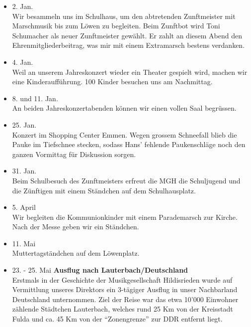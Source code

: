 \begin{history}


    \begin{itemize}

        \item[]2. Jan.\\
        Wir besammeln uns im Schulhaus, um den abtretenden Zunftmeister mit
        Marschmusik bis zum Löwen zu begleiten. Beim Zunftbot wird Toni
        Schumacher als neuer Zunftmeister gewählt. Er zahlt an diesem Abend den
        Ehrenmitgliederbeitrag, was mir mit einem Extramarsch bestens verdanken.

        \item[]4. Jan.\\
        Weil an unserem Jahreskonzert wieder ein Theater gespielt wird, machen
        wir eine Kinderaufführung. 100 Kinder besuchen uns am Nachmittag.

        \item[]8. und 11. Jan.\\
        An beiden Jahreskonzertabenden können wir einen vollen Saal begrüssen.

        \item[]25. Jan.\\
        Konzert im Shopping Center Emmen. Wegen grossem Schneefall blieb die
        Pauke im Tiefschnee stecken, sodass Hans' fehlende Paukenschläge noch
        den ganzen Vormittag für Diskussion sorgen.

        \item[]31. Jan.\\
        Beim Schulbesuch des Zunftmeisters erfreut die MGH die Schuljugend und
        die Zünftigen mit einem Ständchen auf dem Schulhausplatz.

        \item[]5. April\\
        Wir begleiten die Kommunionkinder mit einem Parademarsch zur Kirche.
        Nach der Messe geben wir ein Ständchen.

        \item[]11. Mai\\
        Muttertagständchen auf dem Löwenplatz.

        \item[]23. - 25. Mai \textbf{Ausflug nach Lauterbach/Deutschland}\\
        Erstmals in der Geschichte der Musikgesellschaft Hildisrieden wurde auf
        Vermittlung unseres Direktors ein 3-tägiger Ausflug in unser Nachbarland
        Deutschland unternommen. Ziel der Reise war das etwa 10'000 Einwohner
        zählende Städtchen Lauterbach, welches rund 25 Km von der Kreisstadt
        Fulda und ca. 45 Km von der \enquote{Zonengrenze} zur DDR entfernt
        liegt.


\end{itemize}
\end{history}
